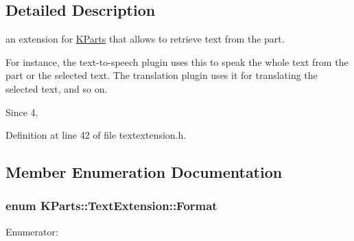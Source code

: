 \subsection{\-Detailed \-Description}
an extension for \hyperlink{namespaceKParts}{\-K\-Parts} that allows to retrieve text from the part. 

\-For instance, the text-\/to-\/speech plugin uses this to speak the whole text from the part or the selected text. \-The translation plugin uses it for translating the selected text, and so on.

\begin{DoxySince}{\-Since}
4. 
\end{DoxySince}


\-Definition at line 42 of file textextension.\-h.



\subsection{\-Member \-Enumeration \-Documentation}
\hypertarget{classKParts_1_1TextExtension_a65ad08598c74eae19f0c7772a251685d}{
\subsubsection[{\-Format}]{\setlength{\rightskip}{0pt plus 5cm}enum {\bf \-K\-Parts\-::\-Text\-Extension\-::\-Format}}}\label{classKParts_1_1TextExtension_a65ad08598c74eae19f0c7772a251685d}
\begin{Desc}
\item[\-Enumerator\-: ]\par
\begin{description}
\item[{\em 
\hypertarget{classKParts_1_1TextExtension_a65ad08598c74eae19f0c7772a251685da8bb1bd219fcb9237fae7b81b6d640f96}{\-Plain\-Text}\label{classKParts_1_1TextExtension_a65ad08598c74eae19f0c7772a251685da8bb1bd219fcb9237fae7b81b6d640f96}
}]\item[{\em 
\hypertarget{classKParts_1_1TextExtension_a65ad08598c74eae19f0c7772a251685da330994e99d37a75f3720547767822f37}{\-H\-T\-M\-L}\label{classKParts_1_1TextExtension_a65ad08598c74eae19f0c7772a251685da330994e99d37a75f3720547767822f37}
}]\end{description}
\end{Desc}



